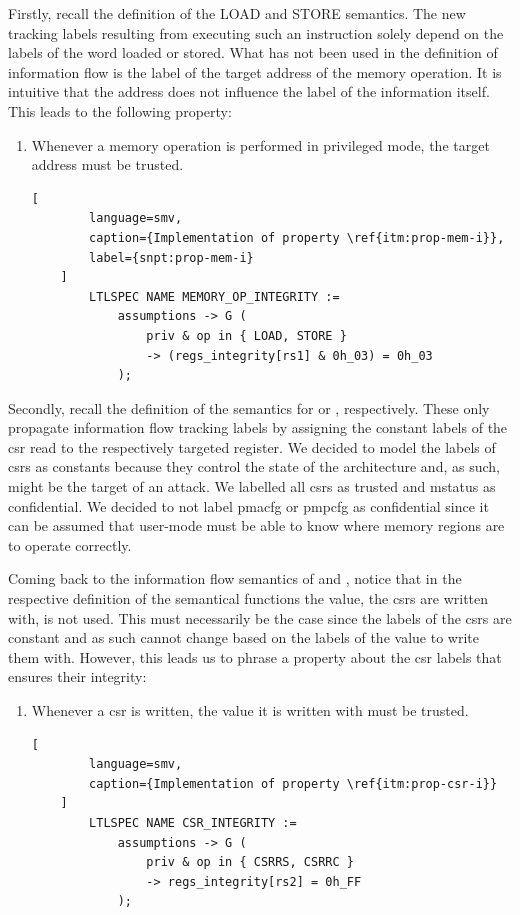 Firstly, recall the definition of the LOAD and STORE semantics.
The new tracking labels resulting from executing such an instruction solely depend on the labels of the word loaded or stored.
What has not been used in the definition of information flow is the label of the target address of the memory operation.
It is intuitive that the address does not influence the label of the information itself.
This leads to the following property:
\begin{enumerate}[label=\Roman*.,series=]
    \item \label{itm:prop-mem-i}
    Whenever a memory operation is performed in privileged mode, the target address must be trusted.

    \begin{lstlisting}[
        language=smv,
        caption={Implementation of property \ref{itm:prop-mem-i}},
        label={snpt:prop-mem-i}
    ]
        LTLSPEC NAME MEMORY_OP_INTEGRITY :=
            assumptions -> G (
                priv & op in { LOAD, STORE }
                -> (regs_integrity[rs1] & 0h_03) = 0h_03
            );
    \end{lstlisting}
\end{enumerate}

Secondly, recall the definition of the semantics for  or , respectively.
These only propagate information flow tracking labels by assigning the constant labels of the \gls{csr} read to the respectively targeted register.
We decided to model the labels of \glspl{csr} as constants because they control the state of the architecture and, as such, might be the target of an attack.
We labelled all \glspl{csr} as trusted and \gls{mstatus} as confidential.
We decided to not label \gls{pmacfg} or \gls{pmpcfg} as confidential since it can be assumed that user-mode must be able to know where memory regions are to operate correctly.

Coming back to the information flow semantics of  and , notice that in the respective definition of the semantical functions the value, the \glspl{csr} are written with, is not used.
This must necessarily be the case since the labels of the \glspl{csr} are constant and as such cannot change based on the labels of the value to write them with.
However, this leads us to phrase a property about the \gls{csr} labels that ensures their integrity:
\begin{enumerate}[label=\Roman*.,resume]
    \item \label{itm:prop-csr-i}
    Whenever a \gls{csr} is written, the value it is written with must be trusted.

    \begin{lstlisting}[
        language=smv,
        caption={Implementation of property \ref{itm:prop-csr-i}}
    ]
        LTLSPEC NAME CSR_INTEGRITY :=
            assumptions -> G (
                priv & op in { CSRRS, CSRRC }
                -> regs_integrity[rs2] = 0h_FF
            );
    \end{lstlisting}
\end{enumerate}

